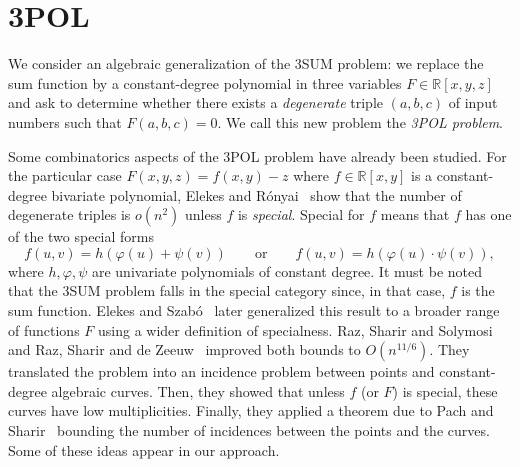 \section{3POL}


We consider an algebraic generalization of the 3SUM problem: we replace the sum
function by a constant-degree polynomial in three variables $F \in
\mathbb{R}[x,y,z]$ and ask to determine whether there exists a
\emph{degenerate} triple $(a,b,c)$ of input numbers such that $F(a,b,c)=0$. We
call this new problem the \emph{3POL problem}.

Some combinatorics aspects of the 3POL problem have already been studied.
%
For the particular case $F(x,y,z) = f(x,y) - z$ where $f \in \mathbb{R}[x,y]$
is a constant-degree bivariate polynomial, Elekes and Rónyai~\cite{ER00} show
that the number of degenerate triples is $o(n^2)$ unless $f$ is
\emph{special}. Special for $f$ means that $f$ has one of the two special forms
\begin{displaymath}
f(u,v)=h(\varphi(u)+\psi(v))
\qquad
\text{or}
\qquad
f(u,v)=h(\varphi(u)\cdot\psi(v)),
\end{displaymath}
where $h,\varphi,\psi$ are univariate polynomials of constant degree.
It must be noted that the 3SUM problem falls in the special category since, in
that case, \( f \) is the sum function.
%
Elekes and Szabó~\cite{ES12} later generalized this result to a broader range
of functions $F$ using a wider definition of specialness.
%
Raz, Sharir and Solymosi~\cite{RSS14} and Raz, Sharir and de Zeeuw~\cite{RSZ15}
improved both bounds to $O(n^{11/6})$.
%
They translated the problem into an incidence problem between points and
constant-degree algebraic curves. Then, they showed that unless $f$ (or $F$) is
special, these curves have low multiplicities. Finally, they applied a theorem
due to Pach and Sharir~\cite{PS98} bounding the number of incidences between
the points and the curves. Some of these ideas appear in our approach.


